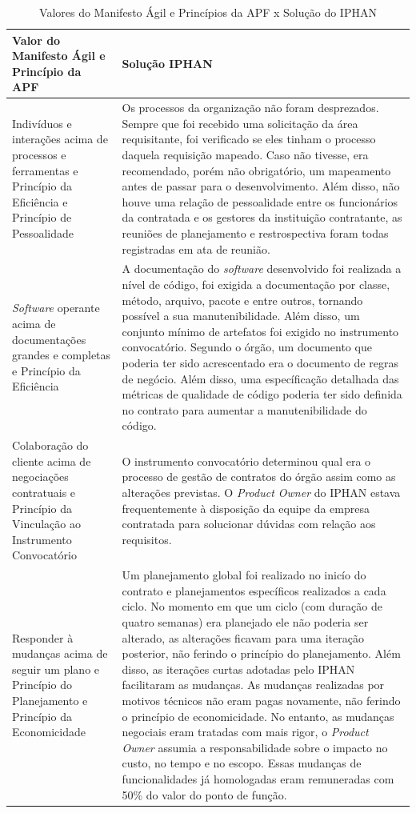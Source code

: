 \begin{table}[H]
\center
\footnotesize
\begin{tabular}{|p{6cm}|p{8cm}|}
  \hline
   \textbf{Valor do Manifesto Ágil e Princípio da APF} & \textbf{Solução IPHAN}\\
    \hline
  Indivíduos e interações acima de processos e ferramentas e Princípio da Eficiência e Princípio de Pessoalidade &  Os processos da organização não foram desprezados. Sempre que foi recebido uma solicitação da área requisitante, foi verificado se eles tinham o processo daquela requisição mapeado. Caso não tivesse, era recomendado, porém não obrigatório, um mapeamento antes  de passar para o desenvolvimento.  Além disso, não houve uma relação de pessoalidade entre os funcionários da contratada e os gestores da instituição contratante, as reuniões de planejamento e restrospectiva foram todas registradas em ata de reunião. \\
   \hline    
 \textit{Software} operante acima de documentações grandes e completas e Princípio da Eficiência & A documentação do \textit{software} desenvolvido foi realizada a nível de código, foi exigida a documentação por classe, método, arquivo, pacote e entre outros, tornando possível a sua manutenibilidade. Além disso, um conjunto
mínimo de artefatos foi exigido no instrumento
convocatório. Segundo o órgão, um documento que poderia ter sido acrescentado era o documento de regras de negócio. Além disso, uma específicação detalhada das métricas de qualidade de código poderia ter sido definida no contrato para aumentar a manutenibilidade do código.\\
    \hline
  Colaboração do cliente acima de negociações contratuais e Princípio da Vinculação ao Instrumento Convocatório &  O instrumento convocatório determinou qual era o processo de gestão de contratos do órgão assim como as alterações previstas. O \textit{Product Owner} do IPHAN estava frequentemente à disposição da equipe da empresa contratada para solucionar dúvidas com relação aos requisitos.\\
   \hline
  Responder à mudanças acima de seguir um plano e Princípio do Planejamento e Princípio da Economicidade & Um planejamento global foi realizado no inicío do contrato e planejamentos específicos realizados a cada ciclo. No momento em que um ciclo (com duração de quatro semanas) era planejado ele não poderia ser alterado, as alterações ficavam para uma iteração posterior, não ferindo o princípio do planejamento. Além disso, as iterações curtas adotadas pelo IPHAN facilitaram as mudanças. As mudanças realizadas por motivos técnicos não eram pagas novamente, não ferindo o princípio de economicidade. No entanto, as mudanças negociais eram tratadas com mais rigor, o \textit{Product Owner} assumia a responsabilidade sobre o impacto no custo, no tempo e no escopo. Essas mudanças de funcionalidades já homologadas eram remuneradas com 50\% do valor do ponto de função. \\
   \hline
\end{tabular}
\caption{Valores do Manifesto Ágil e Princípios da APF x Solução do IPHAN}
\label{apfiphan}
\end{table}


